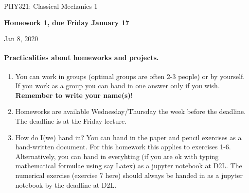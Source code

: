 \documentclass[%
oneside,                 %
final,                   %
10pt]{article}
\begin{document}

\newcommand{\exercisesection}[1]{\subsection*{#1}}






\thispagestyle{empty}

\begin{center}
{\LARGE\bf
\begin{spacing}{1.25}
PHY321: Classical Mechanics 1
\end{spacing}
}
\end{center}


\begin{center}
{\bf Homework 1, due Friday January 17${}^{}$} \\ [0mm]
\end{center}

\begin{center}
\end{center}
    

\begin{center}
Jan 8, 2020
\end{center}

\vspace{1cm}


\paragraph{Practicalities about  homeworks and projects.}
\begin{enumerate}
\item You can work in groups (optimal groups are often 2-3 people) or by yourself. If you work as a group you can hand in one answer only if you wish. \textbf{Remember to write your name(s)}!

\item Homeworks are available Wednesday/Thursday the week before the deadline. The deadline is at the Friday lecture.

\item How do I(we)  hand in?  You can hand in the paper and pencil exercises as a hand-written document. For this homework this applies to exercises 1-6. Alternatively, you can hand in everyhting (if you are ok with typing mathematical formulae using say Latex) as a jupyter notebook at D2L. The numerical exercise (exercise 7 here) should always be handed in as a jupyter notebook by the deadline at D2L. 
\end{enumerate}
\end{document}
